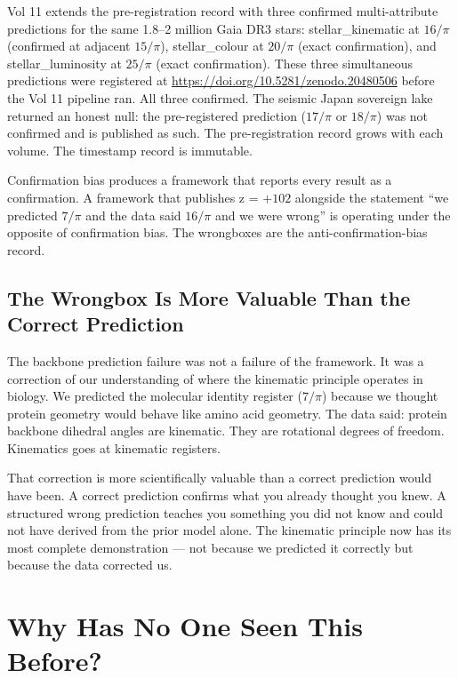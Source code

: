 \documentclass[11pt, letterpaper, openany]{book}
\begin{document}
Vol 11 extends the pre-registration record with three confirmed
multi-attribute predictions for the same 1.8--2 million Gaia DR3
stars: stellar\_kinematic at $16/\pi$ (confirmed at adjacent $15/\pi$),
stellar\_colour at $20/\pi$ (exact confirmation), and stellar\_luminosity
at $25/\pi$ (exact confirmation). These three simultaneous predictions
were registered at \url{https://doi.org/10.5281/zenodo.20480506}
before the Vol 11 pipeline ran. All three confirmed. The seismic
Japan sovereign lake returned an honest null: the pre-registered
prediction ($17/\pi$ or $18/\pi$) was not confirmed and is published
as such. The pre-registration record grows with each volume. The
timestamp record is immutable.
	
Confirmation bias produces a framework that reports every result as
a confirmation. A framework that publishes z = $+102$ alongside
the statement ``we predicted $7/\pi$ and the data said $16/\pi$
and we were wrong'' is operating under the opposite of confirmation
bias. The wrongboxes are the anti-confirmation-bias record.

\section{The Wrongbox Is More Valuable Than the Correct Prediction}

The backbone prediction failure was not a failure of the framework.
It was a correction of our understanding of where the kinematic
principle operates in biology. We predicted the molecular identity
register ($7/\pi$) because we thought protein geometry would behave
like amino acid geometry. The data said: protein backbone dihedral
angles are kinematic. They are rotational degrees of freedom.
Kinematics goes at kinematic registers.

That correction is more scientifically valuable than a correct
prediction would have been. A correct prediction confirms what you
already thought you knew. A structured wrong prediction teaches you
something you did not know and could not have derived from the prior
model alone. The kinematic principle now has its most complete
demonstration --- not because we predicted it correctly but because
the data corrected us.

\clearpage
\chapter{Why Has No One Seen This Before?}
\end{document}
